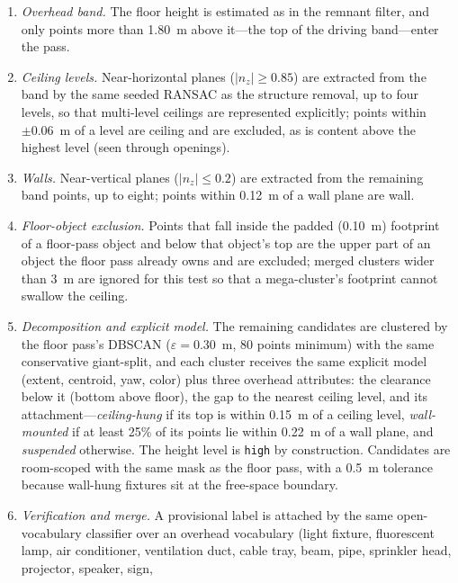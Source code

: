 \begin{enumerate}[leftmargin=2.2em,itemsep=2pt]
  \item \emph{Overhead band.} The floor height is estimated as in the
        remnant filter, and only points more than 1.80~m above it---the top
        of the driving band---enter the pass.
  \item \emph{Ceiling levels.} Near-horizontal planes ($|n_z|\ge0.85$) are
        extracted from the band by the same seeded RANSAC as the structure
        removal, up to four levels, so that multi-level ceilings are
        represented explicitly; points within $\pm0.06$~m of a level are
        ceiling and are excluded, as is content above the highest level
        (seen through openings).
  \item \emph{Walls.} Near-vertical planes ($|n_z|\le0.2$) are extracted from
        the remaining band points, up to eight; points within 0.12~m of a
        wall plane are wall.
  \item \emph{Floor-object exclusion.} Points that fall inside the padded
        (0.10~m) footprint of a floor-pass object and below that object's top
        are the upper part of an object the floor pass already owns and are
        excluded; merged clusters wider than 3~m are ignored for this test so
        that a mega-cluster's footprint cannot swallow the ceiling.
  \item \emph{Decomposition and explicit model.} The remaining candidates
        are clustered by the floor pass's DBSCAN ($\varepsilon=0.30$~m, 80
        points minimum) with the same conservative giant-split, and each
        cluster receives the same explicit model (extent, centroid, yaw,
        color) plus three overhead attributes: the clearance below it (bottom
        above floor), the gap to the nearest ceiling level, and its
        attachment---\emph{ceiling-hung} if its top is within 0.15~m of a
        ceiling level, \emph{wall-mounted} if at least 25\% of its points lie
        within 0.22~m of a wall plane, and \emph{suspended} otherwise. The
        height level is \texttt{high} by construction. Candidates are
        room-scoped with the same mask as the floor pass, with a 0.5~m
        tolerance because wall-hung fixtures sit at the free-space boundary.
  \item \emph{Verification and merge.} A provisional label is attached by
        the same open-vocabulary classifier over an overhead vocabulary
        (light fixture, fluorescent lamp, air conditioner, ventilation duct,
        cable tray, beam, pipe, sprinkler head, projector, speaker, sign,

\end{enumerate}

